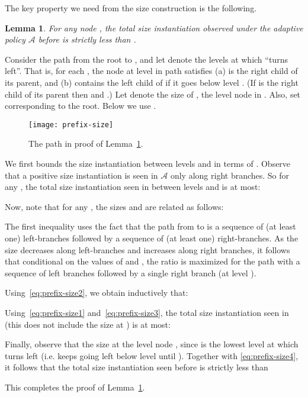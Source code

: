 \documentclass[11pt,letterpaper]{article}
\newtheorem{lemma}[theorem]{Lemma}
\numberwithin{algorithm}{section}
\newenvironment{proof}{

\noindent{\bf Proof:}}
{\hfill


}
\newcommand{\A}[0]{{\ensuremath{\mathcal{A}}}\xspace}
\begin{document}
The key property we need from the size construction is the following.
\begin{lemma}\label{lem:prefix-size}
For any node , the total size instantiation observed under the adaptive policy \A before  is strictly less than .
\end{lemma}
\begin{proof}
Consider the path  from the root to , and let  denote the levels at which  ``turns left''. That is, for each , the node  at level  in path  satisfies (a)  is the right child of its parent, and (b)  contains the left child of  if it goes below level . (If  is the right child of its parent then  and .) Let  denote the size of , the level  node in . Also, set  corresponding to the root. Below we use .

\begin{figure}[ht]
  \begin{centering}
    \texttt{[image: prefix-size]}
    \caption{The path  in proof of Lemma~\ref{lem:prefix-size}.    \label{fig:??} }
  \end{centering}
\end{figure}


We first bounds the size instantiation between levels  and  in terms of .
Observe that a positive size instantiation is seen in \A only along right branches. So for any , the total size instantiation seen in  between levels  and  is at most:


Now, note that for any , the sizes  and  are related as follows:

The first inequality uses the fact that the path from  to  is a sequence of (at least one) left-branches followed
by a sequence of (at least one) right-branches. As the size decreases along left-branches and increases along right branches, it follows that conditional on the values of  and , the  ratio  is maximized for the path with a sequence of left branches followed by a single right branch (at level ).


Using~\eqref{eq:prefix-size2}, we obtain inductively that:



Using~\eqref{eq:prefix-size1} and~\eqref{eq:prefix-size3}, the total size instantiation seen in  (this does not include the size at ) is at most:


Finally, observe that the size at the level  node , since  is the lowest level at which  turns left (i.e.  keeps going left below level  until ). Together with \eqref{eq:prefix-size4}, it follows that the total size instantiation seen before  is strictly less than

This completes the proof of Lemma~\ref{lem:prefix-size}. \end{proof}
\end{document}

